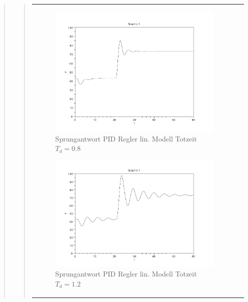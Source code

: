 \begin{quote}
\begin{quote}
\begin{center}
\begin{tabular}{ll}
                \hspace{-2.5cm}
                    \begin{minipage}{0.6\textwidth}
                        \begin{figure}[H]
                            \includegraphics[scale=0.4, trim = 0cm 0cm 0cm
                            0cm, clip]
                            {./Bilder/4_1_Td_08}
                              \caption{Sprungantwort PID Regler lin. Modell Totzeit $T_d = 0.8$}
                        \end{figure}
                    \end{minipage}
                    
                    \begin{minipage}{0.6\textwidth}
                        \begin{figure}[H]
                            \includegraphics[scale=0.4,trim = 0cm 0cm 0cm
                            0cm, clip]
                            {./Bilder/4_1_Td_12}
                              \caption{Sprungantwort PID Regler lin. Modell Totzeit $T_d = 1.2$}
                        \end{figure}
                    \end{minipage}
                

\end{tabular}
\end{center}
\end{quote}
\end{quote}
